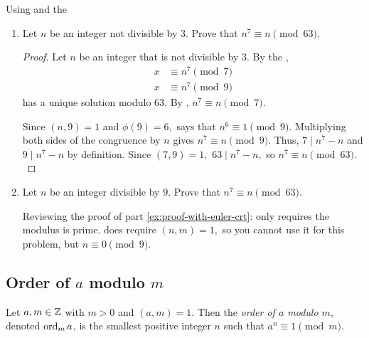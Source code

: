 \documentclass{ximera}
\begin{document}
\begin{ex} Using  and the 
	\begin{enumerate}
 		\item\label{ex:proof-with-euler-crt} Let $n$ be an integer not divisible by $3$. Prove that $n^7\equiv n\pmod{63}$.
 		
         \begin{proof}
            Let $n$ be an integer that is not divisible by $3$. By the , 
            \begin{align*}
                x&\equiv n^7 \pmod{7}\\
                x&\equiv n^7 \pmod{9}
            \end{align*} 
            has a unique solution modulo $63.$ 
            By , $n^7\equiv n\pmod{7}.$ 
            
            Since $(n,9)=1$ and $\phi(9)=6,$  says that $n^6\equiv 1\pmod{9}.$ Multiplying both sides of the congruence by $n$ gives $n^7\equiv n\pmod{9}.$ Thus, $7\mid n^7-n$ and $9\mid n^7-n$ by definition. Since $(7,9)=1,$ $63\mid n^7-n,$ so $n^7\equiv n\pmod{63}.$
         \end{proof}

		\item Let $n$ be an integer divisible by $9$. Prove that $n^7\equiv n \pmod{63}$.
		\begin{remark} Reviewing the proof of part \ref{ex:proof-with-euler-crt}:
             only requires the modulus is prime.  does require $(n,m)=1,$ so you cannot use it for this problem, but $n\equiv 0\pmod{9}.$
        \end{remark}
	\end{enumerate}
\end{ex}

\subsection*{Order of $a$ modulo $m$}

\begin{definition}\label{defn:order}
    Let $a,m\in\mathbb Z$ with $m>0$ and $(a,m)=1.$ Then the \emph{order of $a$ modulo $m$}, denoted $\operatorname{ord}_m a$, is the smallest positive integer $n$ such that $a^n\equiv 1\pmod{m}.$
\end{definition}
\end{document}
